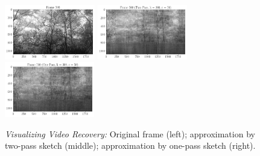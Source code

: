 \begin{figure}[h!]
	\includegraphics[height=2.4cm]{figure/frame500.pdf}
	\includegraphics[height=2.4cm]{figure/2pass_k300_r50_frame500.pdf}
	\includegraphics[height=2.4cm]{figure/1pass_k300_r50_frame500.pdf}
	\centering
	\caption{\textit{Visualizing Video Recovery:}
	Original frame (left);
	approximation by two-pass sketch (middle);
	approximation by one-pass sketch (right).
	}\label{fig:Frame500}
\end{figure}

